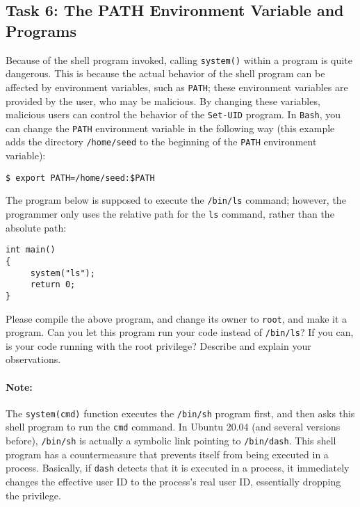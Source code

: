 \subsection{Task 6: The PATH Environment Variable and \setuid Programs}

Because of the shell program invoked, calling {\tt system()} 
within a \setuid program is quite dangerous. This is because the actual behavior of the 
shell program can be affected by environment variables, such
as {\tt PATH}; these environment variables are provided by the user, who 
may be malicious.  By changing these variables, malicious users can control
the behavior of the {\tt Set-UID} program. In {\tt Bash}, you can
change the {\tt PATH} environment variable in the following way (this example 
adds the directory {\tt /home/seed} to the beginning of the {\tt PATH} environment variable):


\begin{lstlisting}
$ export PATH=/home/seed:$PATH
\end{lstlisting}



The \setuid program below is supposed to execute the {\tt /bin/ls} command; 
however, the programmer only uses the relative path for the {\tt ls} 
command, rather than the absolute path:

\begin{lstlisting} 
int main()
{
     system("ls");
     return 0;
}
\end{lstlisting}

Please compile the above program, and change its owner to {\tt root}, and 
make it a \setuid program.  Can you let this \setuid program run your code instead of 
{\tt /bin/ls}?  If you can, is your code running with the root privilege?
Describe and explain your observations. \\


\paragraph{Note:} 
The \texttt{system(cmd)} function executes the \texttt{/bin/sh} program first, and then  
asks this shell program to run the \texttt{cmd} command. 
In Ubuntu 20.04 (and several versions before), \texttt{/bin/sh} is actually 
a symbolic link pointing to \texttt{/bin/dash}. 
This shell program has a countermeasure that prevents itself
from being executed in a \setuid process.  Basically, if \texttt{dash} detects that it is
executed in a \setuid process, it immediately changes the effective user ID to the process's
real user ID, essentially dropping the privilege. 


